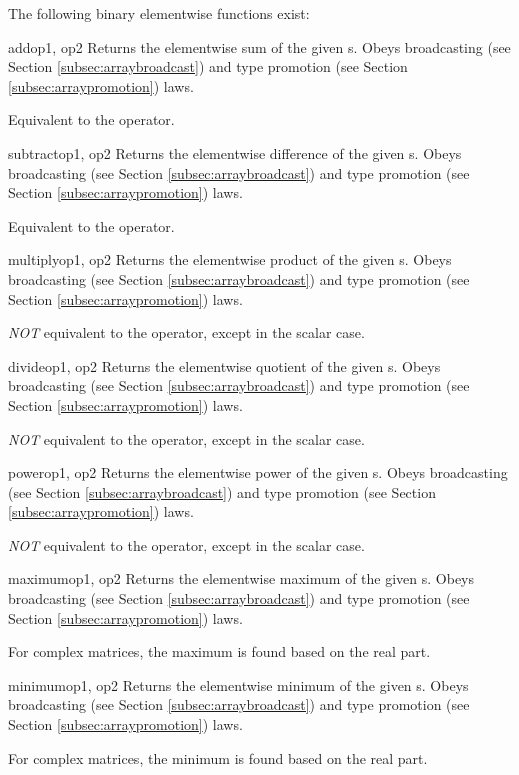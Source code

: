 The following binary elementwise functions exist:

\begin{funcdesc}{add}{op1, op2}
  Returns the elementwise sum of the given s. Obeys
  broadcasting (see Section \ref{subsec:arraybroadcast}) and type
  promotion (see Section \ref{subsec:arraypromotion}) laws.

  Equivalent to the \code{+} operator.
\end{funcdesc}
\begin{funcdesc}{subtract}{op1, op2}
  Returns the elementwise difference of the given s. Obeys
  broadcasting (see Section \ref{subsec:arraybroadcast}) and type
  promotion (see Section \ref{subsec:arraypromotion}) laws.

  Equivalent to the \code{-} operator.
\end{funcdesc}
\begin{funcdesc}{multiply}{op1, op2}
  Returns the elementwise product of the given s. Obeys
  broadcasting (see Section \ref{subsec:arraybroadcast}) and type
  promotion (see Section \ref{subsec:arraypromotion}) laws.

  \emph{NOT} equivalent to the \code{*} operator, except in the scalar
  case.
\end{funcdesc}
\begin{funcdesc}{divide}{op1, op2}
  Returns the elementwise quotient of the given s. Obeys
  broadcasting (see Section \ref{subsec:arraybroadcast}) and type
  promotion (see Section \ref{subsec:arraypromotion}) laws.

  \emph{NOT} equivalent to the \code{/} operator, except in the scalar
  case.
\end{funcdesc}
\begin{funcdesc}{power}{op1, op2}
  Returns the elementwise power  of the given
  s. Obeys broadcasting (see Section
  \ref{subsec:arraybroadcast}) and type promotion (see Section
  \ref{subsec:arraypromotion}) laws.

  \emph{NOT} equivalent to the \code{**} operator, except in the scalar
  case.
\end{funcdesc}
\begin{funcdesc}{maximum}{op1, op2}
  Returns the elementwise maximum of the given
  s. Obeys broadcasting (see Section
  \ref{subsec:arraybroadcast}) and type promotion (see Section
  \ref{subsec:arraypromotion}) laws.

  For complex matrices, the maximum is found based on the real part.
\end{funcdesc}
\begin{funcdesc}{minimum}{op1, op2}
  Returns the elementwise minimum of the given
  s. Obeys broadcasting (see Section
  \ref{subsec:arraybroadcast}) and type promotion (see Section
  \ref{subsec:arraypromotion}) laws.

  For complex matrices, the minimum is found based on the real part.
\end{funcdesc}

